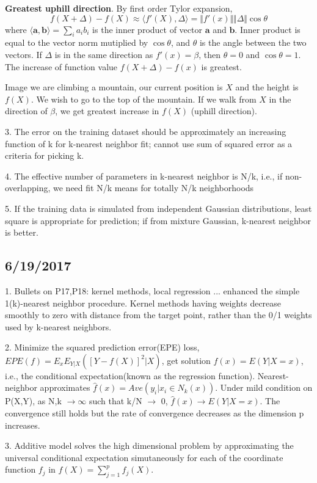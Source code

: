 \documentclass[a4paper, 12pt]{article}
\newcommand{\va}{\mathbf{a}}
\newcommand{\vb}{\mathbf{b}}
\begin{document}
\vspace{10pt}
\noindent \textbf{Greatest uphill direction}. By first order Tylor expansion,
$$
f(X+\Delta) - f(X) \approx \langle f'(X) , \Delta \rangle = \Vert f'(x)\Vert \Vert \Delta\Vert \cos\theta
$$
where $\langle \va,\vb\rangle = \sum_i a_i b_i$ is the inner product of vector 
$\va$ and $\vb$. Inner product is equal to the vector norm mutiplied by $\cos\theta$, and $\theta$ is the angle between the two vectors. If $\Delta$ is in the same direction as $f'(x)=\beta$, then $\theta = 0$ and $\cos\theta = 1$. The increase of function value $f(X+\Delta) - f(x) $ is greatest.  

Image we are climbing a mountain, our current position is $X$ and the height is $f(X)$. We wish to go to the top of the mountain. 
If we walk from $X$ in the direction of $\beta$, we get greatest increase in $f(X)$ (uphill direction).

3. The error on the training dataset should be approximately an increasing function of k for k-nearest neighbor fit; cannot use sum of squared error as a criteria for picking k.

4. The effective number of parameters in k-nearest neighbor is N/k, i.e., if non-overlapping, we need fit N/k means for totally N/k neighborhoods

5. If the training data is simulated from independent Gaussian distributions, least square is appropriate for prediction; if from mixture Gaussian, k-nearest neighbor is better.
\subsection*{6/19/2017}

1. Bullets on P17,P18: kernel methods, local regression ... enhanced the simple 1(k)-nearest neighbor procedure. Kernel methods having weights decrease smoothly to zero with distance from the target point, rather than the 0/1 weights used by k-nearest neighbors.

2. Minimize the squared prediction error(EPE) loss, $EPE(f)= E_xE_{Y|X}([Y-f(X)]^2|X)$, get solution $f(x)= E(Y|X=x)$, i.e., the conditional expectation(known as the regression function). Nearest-neighbor approximates $\hat{f}(x)=Ave(y_i|x_i \in N_k(x))$. Under mild condition on P(X,Y), as N,k $\rightarrow \infty$ such that k/N $\rightarrow$ 0, $\hat{f}(x) \rightarrow E(Y|X=x)$. The convergence still holds but the rate of convergence decreases as the dimension p increases.

3. Additive model solves the high dimensional problem by approximating the universal conditional expectation simutaneously for each of the coordinate function $f_j$ in $f(X)=\sum_{j=1}^pf_j(X)$.
\end{document}
